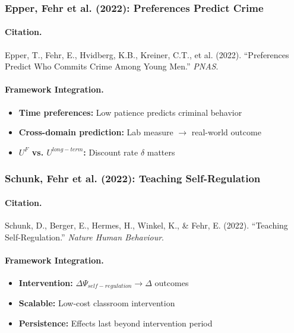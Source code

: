 \subsubsection{Epper, Fehr et al. (2022): Preferences Predict Crime}

\paragraph{Citation.}
Epper, T., Fehr, E., Hvidberg, K.B., Kreiner, C.T., et al. (2022).
``Preferences Predict Who Commits Crime Among Young Men.'' \emph{PNAS}.

\paragraph{Framework Integration.}
\begin{itemize}
  \item \textbf{Time preferences:} Low patience predicts criminal behavior
  \item \textbf{Cross-domain prediction:} Lab measure $\to$ real-world outcome
  \item \textbf{$U^F$ vs. $U^{long-term}$:} Discount rate $\delta$ matters
\end{itemize}

\subsubsection{Schunk, Fehr et al. (2022): Teaching Self-Regulation}

\paragraph{Citation.}
Schunk, D., Berger, E., Hermes, H., Winkel, K., \& Fehr, E. (2022).
``Teaching Self-Regulation.'' \emph{Nature Human Behaviour}.

\paragraph{Framework Integration.}
\begin{itemize}
  \item \textbf{Intervention:} $\Delta\Psi_{self-regulation} \to \Delta$ outcomes
  \item \textbf{Scalable:} Low-cost classroom intervention
  \item \textbf{Persistence:} Effects last beyond intervention period
\end{itemize}


